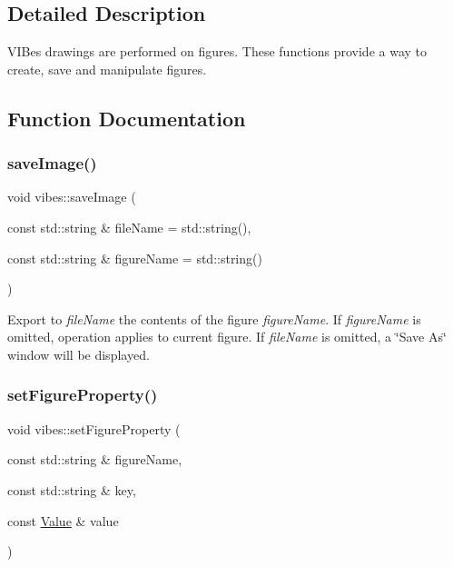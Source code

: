 \subsection{Detailed Description}
V\+I\+Bes drawings are performed on figures. These functions provide a way to create, save and manipulate figures. 



\subsection{Function Documentation}
\mbox{\label{group__figure_gab6e221be3af71ea2286aecd0f7768908}} 
\subsubsection{\texorpdfstring{save\+Image()}{saveImage()}}
{\footnotesize\ttfamily void vibes\+::save\+Image (\begin{DoxyParamCaption}\item[{const std\+::string \&}]{file\+Name = {\ttfamily std\+:\+:string()},  }\item[{const std\+::string \&}]{figure\+Name = {\ttfamily std\+:\+:string()} }\end{DoxyParamCaption})}

Export to {\itshape file\+Name} the contents of the figure {\itshape figure\+Name}. If {\itshape figure\+Name} is omitted, operation applies to current figure. If {\itshape file\+Name} is omitted, a \char`\"{}\+Save As\char`\"{} window will be displayed. \mbox{\label{group__figure_ga9ca04dbb976e764ef5eb85d33f1dc9cb}} 
\subsubsection{\texorpdfstring{set\+Figure\+Property()}{setFigureProperty()}\hspace{0.1cm}{\footnotesize\ttfamily [1/2]}}
{\footnotesize\ttfamily void vibes\+::set\+Figure\+Property (\begin{DoxyParamCaption}\item[{const std\+::string \&}]{figure\+Name,  }\item[{const std\+::string \&}]{key,  }\item[{const \hyperlink{classvibes_1_1_value}{Value} \&}]{value }\end{DoxyParamCaption})\hspace{0.3cm}{\ttfamily [inline]}}



